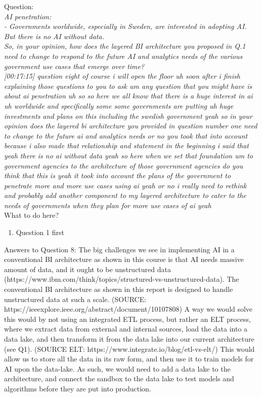 Question:\\
\emph{
    AI penetration:\\
- Governments worldwide, especially in Sweden, are interested in adopting AI.
But there is no AI without data.\\ So, in your opinion, how does the layered BI
architecture you proposed in Q.1 need to change to respond to the future AI and
analytics needs of the various government use cases that emerge over time?
}\\

\emph{[00:17:15] question eight of course i will open the floor uh soon after i
finish explaining those questions to you to ask um any question that you might have is about ai penetration
uh so so here we all know that there is a huge interest in ai uh worldwide and specifically some
some governments are putting uh huge investments and plans on this including the swedish government
yeah so in your opinion does the layered bi architecture you provided in question number
one need to change to the future ai and analytics needs or no you took that into account because i also
made that relationship and statement in the beginning i said that yeah there is no ai without data
yeah so here when we set that foundation um to government agencies to the architecture of those government
agencies do you think that this is yeah it took into account the plans of the government to penetrate
more and more use cases using ai yeah or no i really need to rethink and probably add another component
to my layered architecture to cater to the needs of governments when they plan for more use cases
of ai yeah}\\

What to do here?
\begin{enumerate}
    \item Question 1 first
  \end{enumerate}

\newpage Answers to Question 8:
The big challenges we see in implementing AI in a conventional BI architecture as shown in this course is that AI needs massive amount of data, 
and it ought to be unstructured data (https://www.ibm.com/think/topics/structured-vs-unstructured-data).
The conventional BI architecture as shown in this report is designed to handle unstructured data at such a scale.
(SOURCE: https://ieeexplore.ieee.org/abstract/document/10107808)
A way we would solve this would by not using an integrated ETL process, but rather an ELT process, where we extract data from external and internal sources,
load the data into a data lake, and then transform it from the data lake into our current architecture (see Q1).
(SOURCE ELT: https://www.integrate.io/blog/etl-vs-elt/)
This would allow us to store all the data in its raw form, and then use it to train models for AI upon the data-lake.
As such, we would need to add a data lake to the architecture, and connect the sandbox to the data lake to test models and 
algorithms before they are put into production.

